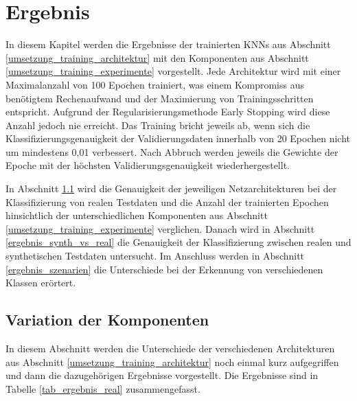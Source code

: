 

\chapter{Ergebnis}
\label{ergebnis}

In diesem Kapitel werden die Ergebnisse der trainierten \acp{KNN} aus Abschnitt \ref{umsetzung_training_architektur} mit den Komponenten aus Abschnitt \ref{umsetzung_training_experimente} vorgestellt. Jede Architektur wird mit einer Maximalanzahl von 100 Epochen trainiert, was einem Kompromiss aus benötigtem Rechenaufwand und der Maximierung von Trainingsschritten entspricht. Aufgrund der Regularisierungsmethode Early Stopping wird diese Anzahl jedoch nie erreicht. Das Training bricht jeweils ab, wenn sich die Klassifizierungsgenauigkeit der Validierungsdaten innerhalb von 20 Epochen nicht um mindestens 0,01 verbessert. Nach Abbruch werden jeweils die Gewichte der Epoche mit der höchsten Validierungsgenauigkeit wiederhergestellt. 

In Abschnitt \ref{ergebnis_parameter} wird die Genauigkeit der jeweiligen Netzarchitekturen bei der Klassifizierung von realen Testdaten und die Anzahl der trainierten Epochen hinsichtlich der unterschiedlichen Komponenten aus Abschnitt \ref{umsetzung_training_experimente} verglichen. Danach wird in Abschnitt \ref{ergebnis_synth_vs_real} die Genauigkeit der Klassifizierung zwischen realen und synthetischen Testdaten untersucht. Im Anschluss werden in Abschnitt \ref{ergebnis_szenarien} die Unterschiede bei der Erkennung von verschiedenen Klassen erörtert.

\section{Variation der Komponenten}
\label{ergebnis_parameter}

In diesem Abschnitt werden die Unterschiede der verschiedenen Architekturen aus Abschnitt \ref{umsetzung_training_architektur} noch einmal kurz aufgegriffen und dann die dazugehörigen Ergebnisse vorgestellt. Die Ergebnisse sind in Tabelle \ref{tab_ergebnis_real} zusammengefasst.

